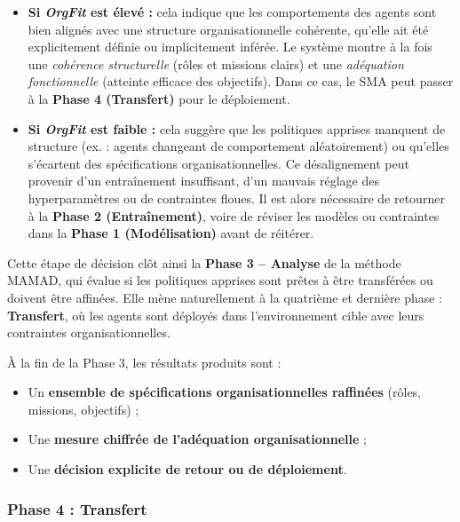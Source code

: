 \begin{itemize}
    \item \textbf{Si \textit{OrgFit} est élevé :} cela indique que les comportements des agents sont bien alignés avec une structure organisationnelle cohérente, qu'elle ait été explicitement définie ou implicitement inférée. Le système montre à la fois une \textit{cohérence structurelle} (rôles et missions clairs) et une \textit{adéquation fonctionnelle} (atteinte efficace des objectifs). Dans ce cas, le SMA peut passer à la \textbf{Phase 4 (Transfert)} pour le déploiement.
          
    \item \textbf{Si \textit{OrgFit} est faible :} cela suggère que les politiques apprises manquent de structure (ex. : agents changeant de comportement aléatoirement) ou qu'elles s'écartent des spécifications organisationnelles. Ce désalignement peut provenir d'un entraînement insuffisant, d'un mauvais réglage des hyperparamètres ou de contraintes floues. Il est alors nécessaire de retourner à la \textbf{Phase 2 (Entraînement)}, voire de réviser les modèles ou contraintes dans la \textbf{Phase 1 (Modélisation)} avant de réitérer.
\end{itemize}

\vspace{0.4em}
\noindent Cette étape de décision clôt ainsi la \textbf{Phase 3 – Analyse} de la méthode MAMAD, qui évalue si les politiques apprises sont prêtes à être transférées ou doivent être affinées. Elle mène naturellement à la quatrième et dernière phase : \textbf{Transfert}, où les agents sont déployés dans l'environnement cible avec leurs contraintes organisationnelles.

\vspace{0.4em}
\noindent À la fin de la Phase 3, les résultats produits sont :
\begin{itemize}
    \item Un \textbf{ensemble de spécifications organisationnelles raffinées} (rôles, missions, objectifs) ;
    \item Une \textbf{mesure chiffrée de l'adéquation organisationnelle} ;
    \item Une \textbf{décision explicite de retour ou de déploiement}.
\end{itemize}

\subsubsection{Phase 4 : Transfert}

